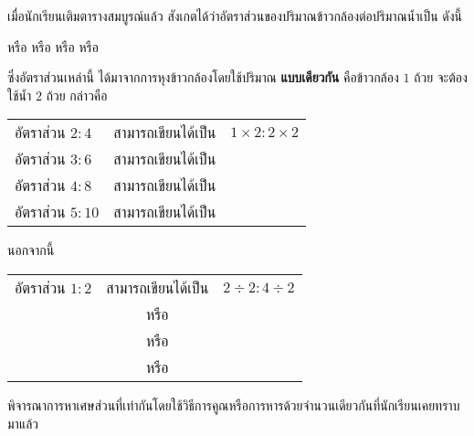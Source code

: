 \documentclass[
  a4paper,
  DIV=11,
  numbers=noendperiod]{scrartcl}
\begin{document}
เมื่อนักเรียนเติมตารางสมบูรณ์แล้ว สังเกตได้ว่าอัตราส่วนของปริมาณข้าวกล้องต่อปริมาณน้ำเป็น
ดังนี้

\centering

\makebox[1.5cm]{\dotfill} หรือ \makebox[1.5cm]{\dotfill} หรือ
\makebox[1.5cm]{\dotfill} หรือ \makebox[1.5cm]{\dotfill} หรือ
\makebox[1.5cm]{\dotfill}

\flushleft

ซึ่งอัตราส่วนเหล่านี้ ได้มาจากการหุงข้าวกล้องโดยใช้ปริมาณ \textbf{แบบเดียวกัน}
คือข้าวกล้อง \(1\) ถ้วย จะต้องใช้น้ำ \(2\) ถ้วย กล่าวคือ

\begin{tabular}{lcp{10cm}}
อัตราส่วน $2:4$  & สามารถเขียนได้เป็น & $1\times 2 : 2\times 2$ \\
อัตราส่วน $3:6$  & สามารถเขียนได้เป็น &  \dotfill                       \\
อัตราส่วน $4:8$  & สามารถเขียนได้เป็น &    \dotfill                      \\
อัตราส่วน $5:10$ & สามารถเขียนได้เป็น &   \dotfill                      \\
\end{tabular}

นอกจากนี้

\begin{tabular}{lcp{10cm}}

อัตราส่วน $1:2$   & สามารถเขียนได้เป็น & $2\div 2 : 4\div 2$ \\
                & หรือ &  \dotfill                       \\
                & หรือ &    \dotfill                      \\
                & หรือ &   \dotfill                      \\

\end{tabular}

พิจารณาการหาเศษส่วนที่เท่ากันโดยใช้วิธีการคูณหรือการหารด้วยจำนวนเดียวกันที่นักเรียนเคยทราบมาแล้ว

\centering

\renewcommand{\arraystretch}{2.5}
\end{document}
